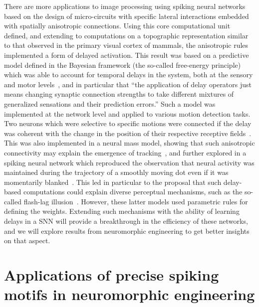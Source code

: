 \documentclass[brainsci, %
               review,submit,pdftex,moreauthors
               ]{Definitions/mdpi}
\begin{document}
There are more applications to image processing using spiking neural networks based on the design of micro-circuits with specific lateral interactions embedded with spatially anisotropic connections. Using this core computational unit defined, and extending to computations on a topographic representation similar to that observed in the primary visual cortex of mammals, the anisotropic rules implemented a form of delayed activation. This result was based on a predictive model defined in the Bayesian framework (the so-called free-energy principle) which was able to account for temporal delays in the  system, both at the sensory and motor levels~\citep{perrinet_active_2014}, and in particular that ``the application of delay operators just means changing synaptic connection strengths to take different mixtures of generalized sensations and their prediction errors.'' Such a model was implemented at the network level and applied to various motion detection tasks. Two neurons which were selective to specific motions were connected if the delay was coherent with the change in the position of their respective receptive fields~\citep{hogendoorn_predictive_2019}.  This was also implemented in a neural mass model, showing that such anisotropic connectivity may explain the emergence of tracking~\citep{khoei_motion-based_2013}, and further explored in a spiking neural network which reproduced the observation that neural activity was maintained during the trajectory of a smoothly moving dot even if it was momentarily blanked~\citep{kaplan_anisotropic_2013}. This led in particular to the proposal that such delay-based computations could explain diverse perceptual mechanisms, such as the so-called flash-lag illusion~\citep{khoei_flash-lag_2017}. However, these latter models used parametric rules for defining the weights. Extending such mechanisms with the ability of learning delays in a SNN will provide a breakthrough in the efficiency of these networks, and we will explore results from neuromorphic engineering to get better insights on that aspect.
%
\section{Applications of precise spiking motifs in neuromorphic engineering}
\label{sec:neuromorphic}
%
\end{document}
